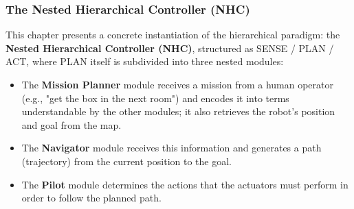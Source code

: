 \subsubsection{ The Nested Hierarchical Controller (NHC)}

This chapter presents a concrete instantiation of the hierarchical paradigm: the \textbf{Nested Hierarchical Controller (NHC)}, structured as SENSE / PLAN / ACT, where PLAN itself is subdivided into three nested modules:

\begin{itemize}
    \item The \textbf{Mission Planner} module receives a mission from a human operator (e.g., "get the box in the next room") and encodes it into terms understandable by the other modules; it also retrieves the robot's position and goal from the map.

    \vspace{0.2cm}
    \item The \textbf{Navigator} module receives this information and generates a path (trajectory) from the current position to the goal.

    \vspace{0.2cm}
    \item The \textbf{Pilot} module determines the actions that the actuators must perform in order to follow the planned path.
\end{itemize}

